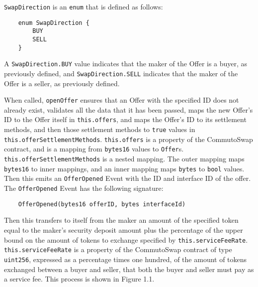 \documentclass[11pt]{article}
\begin{document}
    \verb|SwapDirection| is an \verb|enum| that is defined as follows:
    \begin{verbatim}
    enum SwapDirection {
        BUY
        SELL
    }
    \end{verbatim}
    A \verb|SwapDirection.BUY| value indicates that the maker of the Offer is a buyer, as previously
    defined, and \verb|SwapDirection.SELL| indicates that the maker of the Offer is a seller, as
    previously defined.

    When called, \verb|openOffer| ensures that an Offer with the specified ID does not already
    exist, validates all the data that it has been passed, maps the new Offer's ID to the Offer
    itself in \verb|this.offers|, and maps the Offer's ID to its settlement methods, and then those
    settlement methods to \verb|true| values in \verb|this.offerSettlementMethods|.
    \verb|this.offers| is a property of the CommutoSwap contract, and is a mapping from
    \verb|bytes16| values to \verb|Offer|s.
    \verb|this.offerSettlementMethods| is a nested mapping.
    The outer mapping maps \verb|bytes16| to inner mappings, and an inner mapping maps \verb|bytes|
    to \verb|bool| values.
    Then this emits an \verb|OfferOpened| Event with the ID and interface ID of the offer.
    The \verb|OfferOpened| Event has the following signature:
    \begin{verbatim}
    OfferOpened(bytes16 offerID, bytes interfaceId)
    \end{verbatim}
    Then this transfers to itself from the maker an amount of the specified token equal to the
    maker's security deposit amount plus the percentage of the upper bound on the amount of tokens
    to exchange specified by \verb|this.serviceFeeRate|.
    \verb|this.serviceFeeRate| is a property of the CommutoSwap contract of type \verb|uint256|,
    expressed as a percentage times one hundred, of the amount of tokens exchanged between a buyer
    and seller, that both the buyer and seller must pay as a service fee.
    This process is shown in Figure 1.1.
\end{document}
